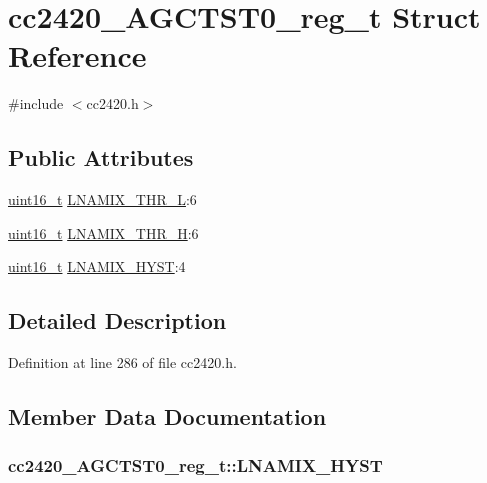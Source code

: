 \hypertarget{structcc2420___a_g_c_t_s_t0__reg__t}{}\section{cc2420\+\_\+\+A\+G\+C\+T\+S\+T0\+\_\+reg\+\_\+t Struct Reference}
\label{structcc2420___a_g_c_t_s_t0__reg__t}


{\ttfamily \#include $<$cc2420.\+h$>$}

\subsection*{Public Attributes}
\begin{DoxyCompactItemize}
\item 
\hyperlink{_p_e___types_8h_a1f1825b69244eb3ad2c7165ddc99c956}{uint16\+\_\+t} \hyperlink{structcc2420___a_g_c_t_s_t0__reg__t_aa6c95f07f18589a6f48185366d139930}{L\+N\+A\+M\+I\+X\+\_\+\+T\+H\+R\+\_\+L}\+:6
\item 
\hyperlink{_p_e___types_8h_a1f1825b69244eb3ad2c7165ddc99c956}{uint16\+\_\+t} \hyperlink{structcc2420___a_g_c_t_s_t0__reg__t_a1261ba072fa60340b6f2f66f0df2238b}{L\+N\+A\+M\+I\+X\+\_\+\+T\+H\+R\+\_\+H}\+:6
\item 
\hyperlink{_p_e___types_8h_a1f1825b69244eb3ad2c7165ddc99c956}{uint16\+\_\+t} \hyperlink{structcc2420___a_g_c_t_s_t0__reg__t_acafaf3f61d6c9e95a7ec91aacafae39d}{L\+N\+A\+M\+I\+X\+\_\+\+H\+Y\+ST}\+:4
\end{DoxyCompactItemize}


\subsection{Detailed Description}


Definition at line 286 of file cc2420.\+h.



\subsection{Member Data Documentation}
\subsubsection[{\texorpdfstring{L\+N\+A\+M\+I\+X\+\_\+\+H\+Y\+ST}{LNAMIX_HYST}}]{ cc2420\+\_\+\+A\+G\+C\+T\+S\+T0\+\_\+reg\+\_\+t\+::\+L\+N\+A\+M\+I\+X\+\_\+\+H\+Y\+ST}\hypertarget{structcc2420___a_g_c_t_s_t0__reg__t_acafaf3f61d6c9e95a7ec91aacafae39d}{}\label{structcc2420___a_g_c_t_s_t0__reg__t_acafaf3f61d6c9e95a7ec91aacafae39d}



